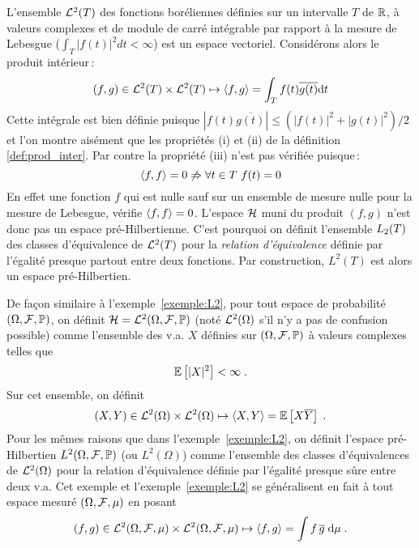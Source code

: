 \begin{example}
\label{exemple:L2}
  L'ensemble $\mathcal{L}^2(T)$ des fonctions bor\'{e}liennes d\'{e}finies sur un intervalle
  $T$ de $\mathbb{R}$, \`{a} valeurs complexes et de module de carr\'{e} int\'{e}grable par
  rapport \`{a} la mesure de Lebesgue ($\int_T |f(t)|^2 dt < \infty$) est un espace
  vectoriel.  Consid\'{e}rons alors le produit int\'{e}rieur\,:
\[
   (f,g) \in \mathcal{L}^2(T) \times \mathcal{L}^2(T)
    \mapsto \left\langle f, g \right\rangle=\int_T f(t) \overline{g(t)} \mathrm{d} t
\]
Cette int\'{e}grale est bien d\'{e}finie puisque
$|{f(t)} \overline{g(t)}|\leq(|f(t)|^2+|g(t)|^2)/2$
et l'on montre ais\'{e}ment que les propri\'{e}t\'{e}s
(i) et (ii) de la d\'{e}finition \ref{def:prod_inter}. Par contre la
propri\'{e}t\'{e} (iii) n'est pas v\'{e}rifi\'{e}e puisque\,:
\[
 \pscal{f}{f}=0 \not\Rightarrow \forall t\in T\ f(t)=0
\]
En effet une fonction $f$ qui est nulle sauf sur un ensemble de
mesure nulle pour la mesure de Lebesgue, v\'{e}rifie $\left\langle f, f \right\rangle=0$.
L'espace $\mathcal{H}$ muni du produit $(f,g)$ n'est donc pas un espace
pr\'{e}-Hilbertienne.
C'est pourquoi on d\'{e}finit l'ensemble $L_2(T)$ des classes d'\'{e}quivalence
de  $\mathcal{L}^2(T)$ pour la \emph{relation d'\'{e}quivalence} d\'{e}finie par
l'\'{e}galit\'{e} presque partout entre deux fonctions. Par construction,
 $L^2(T)$ est alors un espace pr\'{e}-Hilbertien.
\end{example}
\begin{example}
\label{exemple:L2Omega}
De fa\c{c}on similaire \`{a} l'exemple~\ref{exemple:L2}, pour tout espace de
probabilit\'{e} $(\Omega,\mathcal{F},\mathbb{P})$, on d\'{e}finit $\mathcal{H}=\mathcal{L}^2(\Omega,\mathcal{F},\mathbb{P})$
(not\'{e} $\mathcal{L}^2(\Omega)$ s'il n'y a pas de confusion possible) comme l'ensemble
des v.a. $X$ d\'{e}finies sur  $(\Omega,\mathcal{F},\mathbb{P})$ \`{a} valeurs complexes telles que
$$
{\mathbb E}\left[ |X|^2 \right]<\infty\;.
$$
Sur cet ensemble, on d\'{e}finit
$$
   (X,Y) \in \mathcal{L}^2(\Omega)\times \mathcal{L}^2(\Omega)
    \mapsto \left\langle X, Y \right\rangle={\mathbb E}\left[  X \overline{Y} \right]\;.
$$
Pour les m\^{e}mes raisons que dans l'exemple~\ref{exemple:L2}, on d\'{e}finit l'espace
pr\'{e}-Hilbertien $L^2(\Omega,\mathcal{F},\mathbb{P})$ (ou $L^2(\Omega)$) comme l'ensemble des
classes d'\'{e}quivalences de $\mathcal{L}^2(\Omega)$ pour la relation d'\'{e}quivalence
d\'{e}finie par l'\'{e}galit\'{e} presque s\^{u}re entre deux v.a.
Cet exemple et l'exemple~\ref{exemple:L2} se g\'{e}n\'{e}ralisent en fait \`{a} tout espace
mesur\'{e} $(\Omega,\mathcal{F},\mu)$ en posant
$$
(f,g) \in \mathcal{L}^2(\Omega,\mathcal{F},\mu)\times \mathcal{L}^2(\Omega,\mathcal{F},\mu)
    \mapsto \left\langle f, g \right\rangle=\int f\, \overline{g} \;\mathrm{d}\mu \;.
$$
\end{example}

